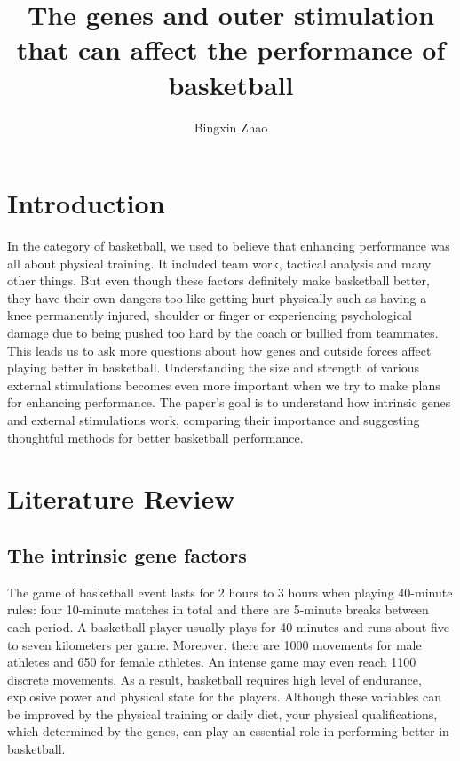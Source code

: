 \documentclass[man,floatsintext]{apa7}
\title{The genes and outer stimulation that can affect the performance of basketball}
\author{Bingxin Zhao}
\affiliation{
Centre Number: 94825 \\
Candidate Number: 1032 \\
Unit Number: P301 \\
EPQ June 2024
}
\begin{document}
\maketitle
\tableofcontents
\newpage


\section{Introduction}


In the category of basketball, we used to believe that enhancing performance was all about physical training. It included team work, tactical analysis and many other things. But even though these factors definitely make basketball better, they have their own dangers too like getting hurt physically such as having a knee permanently injured, shoulder or finger or experiencing psychological damage due to being pushed too hard by the coach or bullied from teammates. This leads us to ask more questions about how genes and outside forces affect playing better in basketball. Understanding the size and strength of various external stimulations becomes even more important when we try to make plans for enhancing performance. The paper's goal is to understand how intrinsic genes and external stimulations work, comparing their importance and suggesting thoughtful methods for better basketball performance. 

\section{Literature Review}

\subsection{The intrinsic gene factors}
The game of basketball event lasts for 2 hours to 3 hours when playing 40-minute rules: four 10-minute matches in total and there are 5-minute breaks between each period. A basketball player usually plays for 40 minutes and runs about five to seven kilometers per game. Moreover, there are 1000 movements for male athletes and 650 for female athletes. An intense game may even reach 1100 discrete movements.\autocite[13-14]{raduScienceBasketball2018} As a result, basketball requires high level of endurance, explosive power and physical state for the players. Although these variables can be improved by the physical training or daily diet, your physical qualifications, which determined by the genes, can play an essential role in performing better in basketball.
\end{document}
